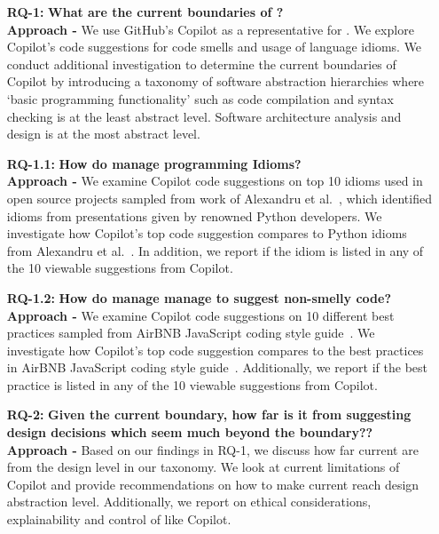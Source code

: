 \begin{enumerate}
  \item[\textbf{RQ-1: }]
  \textbf{What are the current boundaries of \cct{}?} \\
  \textbf{Approach -} We use GitHub's Copilot as a representative for \cct{}. We explore Copilot's code suggestions for code smells and usage of language idioms. We conduct additional investigation to determine the current boundaries of Copilot by introducing a taxonomy of software abstraction hierarchies where ‘basic programming functionality’ such as code compilation and syntax checking is at the least abstract level. Software architecture analysis and design is at the most abstract level. 
  
  \item[\textbf{RQ-1.1: }]
  \textbf{How do \cct{} manage programming Idioms?} \\
  \textbf{Approach -} We examine Copilot code suggestions on top 10 idioms used in open source projects sampled from work of Alexandru et al.~\cite{Alexandru2018}, which identified idioms from presentations given by renowned Python developers. We investigate how Copilot's top code suggestion compares to Python idioms from Alexandru et al.~\cite{Alexandru2018}. In addition, we report if the idiom is listed in any of the 10 viewable suggestions from Copilot.
  
  \item[\textbf{RQ-1.2: }]
  \textbf{How do \cct{} manage manage to suggest non-smelly code?} \\
\textbf{Approach -} We examine Copilot code suggestions on 10 different best practices sampled from AirBNB JavaScript coding style guide~\cite{airbnb_code}. We investigate how Copilot's top code suggestion compares to the best practices in AirBNB JavaScript coding style guide~\cite{airbnb_code}. Additionally, we report if the best practice is listed in any of the 10 viewable suggestions from Copilot. 
 
  \item[\textbf{RQ-2: }]
  \textbf{Given the current boundary, how far is it from suggesting design decisions which seem much beyond the boundary??} \\
  \textbf{Approach -} Based on our findings in RQ-1, we discuss how far current \cct{} are from the design level in our taxonomy. We look at current limitations of Copilot and provide recommendations on how to make current \cct{} reach design abstraction level. Additionally, we report on ethical considerations, explainability and control of \cct{} like Copilot. 
\end{enumerate}